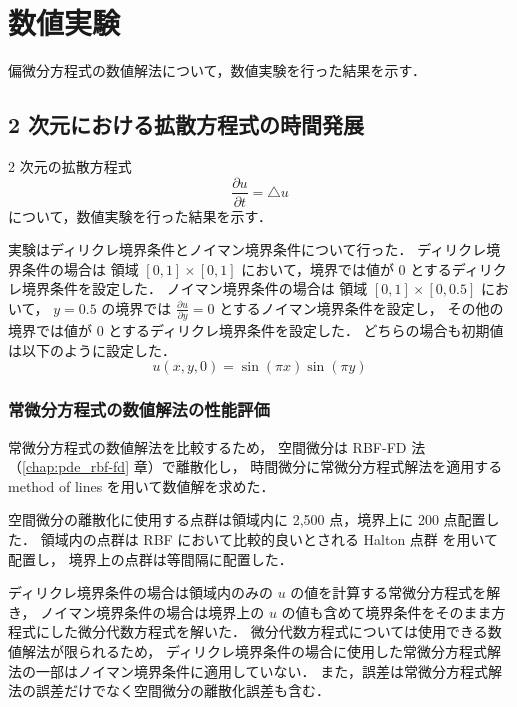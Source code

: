 %

\chapter{数値実験}\label{chap:pde_experiments}

偏微分方程式の数値解法について，数値実験を行った結果を示す．

\section{2 次元における拡散方程式の時間発展}

2 次元の拡散方程式
\begin{equation}
    \frac{\partial u}{\partial t} = \triangle u
\end{equation}
について，数値実験を行った結果を示す．

実験はディリクレ境界条件とノイマン境界条件について行った．
ディリクレ境界条件の場合は
領域 $[0, 1] \times [0, 1]$ において，境界では値が 0 とするディリクレ境界条件を設定した．
ノイマン境界条件の場合は
領域 $[0, 1] \times [0, 0.5]$ において，
$y = 0.5$ の境界では $\frac{\partial u}{\partial y} = 0$ とするノイマン境界条件を設定し，
その他の境界では値が 0 とするディリクレ境界条件を設定した．
どちらの場合も初期値は以下のように設定した．
\begin{equation}
    u(x, y, 0) = \sin(\pi x) \sin(\pi y)
\end{equation}

\subsection{常微分方程式の数値解法の性能評価}

常微分方程式の数値解法を比較するため，
空間微分は RBF-FD 法（\ref{chap:pde_rbf-fd} 章）で離散化し，
時間微分に常微分方程式解法を適用する method of lines  を用いて数値解を求めた．

空間微分の離散化に使用する点群は領域内に 2,500 点，境界上に 200 点配置した．
領域内の点群は RBF において比較的良いとされる Halton 点群 \cite{Fornberg2015} を用いて配置し，
境界上の点群は等間隔に配置した．

ディリクレ境界条件の場合は領域内のみの $u$ の値を計算する常微分方程式を解き，
ノイマン境界条件の場合は境界上の $u$ の値も含めて境界条件をそのまま方程式にした微分代数方程式を解いた．
微分代数方程式については使用できる数値解法が限られるため，
ディリクレ境界条件の場合に使用した常微分方程式解法の一部はノイマン境界条件に適用していない．
また，誤差は常微分方程式解法の誤差だけでなく空間微分の離散化誤差も含む．

